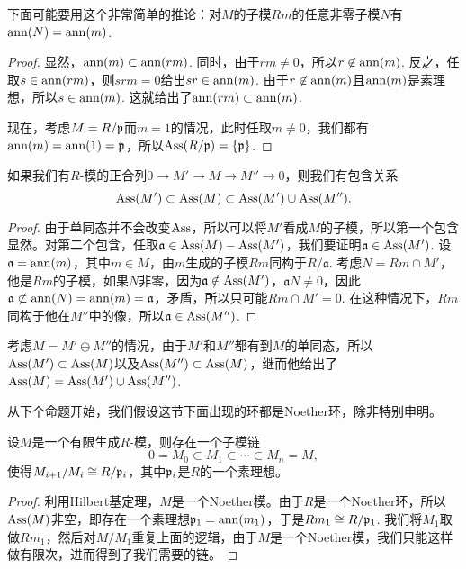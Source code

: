 下面可能要用这个非常简单的推论：对$M$的子模$Rm$的任意非零子模$N$有$\operatorname{ann}(N)=\operatorname{ann}(m)$.

\begin{proof}
	显然，$\operatorname{ann}(m)\subset \operatorname{ann}(rm)$. 同时，由于$rm\neq 0$，所以$r\not\in \operatorname{ann}(m)$. 反之，任取$s\in \operatorname{ann}(rm)$，则$srm=0$给出$sr\in \operatorname{ann}(m)$. 由于$r\not\in \operatorname{ann}(m)$且$\operatorname{ann}(m)$是素理想，所以$s\in \operatorname{ann}(m)$. 这就给出了$\operatorname{ann}(rm)\subset \operatorname{ann}(m)$.

	现在，考虑$M=R/\mathfrak{p}$而$m=1$的情况，此时任取$m\neq 0$，我们都有$\operatorname{ann}(m)=\operatorname{ann}(1)=\mathfrak{p}$，所以$\operatorname{Ass}(R/\mathfrak{p})=\{\mathfrak{p}\}$.
\end{proof}

\begin{pro}
如果我们有$R$-模的正合列$0\to M'\to M\to M''\to 0$，则我们有包含关系
\[
	\operatorname{Ass}(M')\subset \operatorname{Ass}(M)\subset \operatorname{Ass}(M')\cup \operatorname{Ass}(M'').
\]
\end{pro}

\begin{proof}
	由于单同态并不会改变$\operatorname{Ass}$，所以可以将$M'$看成$M$的子模，所以第一个包含显然。对第二个包含，任取$\mathfrak{a}\in \operatorname{Ass}(M)-\operatorname{Ass}(M')$，我们要证明$\mathfrak{a}\in \operatorname{Ass}(M')$. 设$\mathfrak{a}=\operatorname{ann}(m)$，其中$m\in M$，由$m$生成的子模$Rm$同构于$R/\mathfrak{a}$. 考虑$N=Rm\cap M'$，他是$Rm$的子模，如果$N$非零，因为$\mathfrak{a}\notin \operatorname{Ass}(M')$，$\mathfrak{a}N\neq 0$，因此$\mathfrak{a}\not\subset \operatorname{ann}(N)=\operatorname{ann}(m)=\mathfrak{a}$，矛盾，所以只可能$Rm\cap M'=0$. 在这种情况下，$Rm$同构于他在$M''$中的像，所以$\mathfrak{a}\in \operatorname{Ass}(M'')$.
\end{proof}

考虑$M=M'\oplus M''$的情况，由于$M'$和$M''$都有到$M$的单同态，所以$\operatorname{Ass}(M')\subset \operatorname{Ass}(M)$以及$\operatorname{Ass}(M'')\subset \operatorname{Ass}(M)$，继而他给出了$\operatorname{Ass}(M)=\operatorname{Ass}(M')\cup \operatorname{Ass}(M'')$.

从下个命题开始，我们假设这节下面出现的环都是Noether环，除非特别申明。

\begin{pro}
设$M$是一个有限生成$R$-模，则存在一个子模链
\[
	0=M_0\subset M_1\subset \cdots\subset M_n=M,
\]
使得$M_{i+1}/M_i\cong R/\mathfrak{p}_i$，其中$\mathfrak{p}_i$是$R$的一个素理想。
\end{pro}

\begin{proof}
利用Hilbert基定理，$M$是一个Noether模。由于$R$是一个Noether环，所以$\operatorname{Ass}(M)$非空，即存在一个素理想$\mathfrak{p}_1=\operatorname{ann}(m_1)$，于是$Rm_1\cong R/\mathfrak{p}_1$. 我们将$M_1$取做$Rm_1$，然后对$M/M_1$重复上面的逻辑，由于$M$是一个Noether模，我们只能这样做有限次，进而得到了我们需要的链。
\end{proof}

